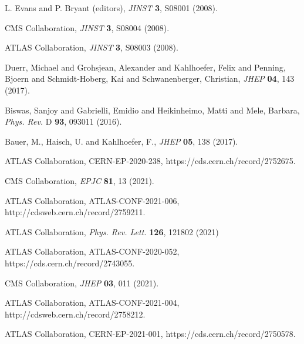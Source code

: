 \documentclass{moriond}
\def\Journal#1#2#3#4{{#1} {\bf #2}, #3 (#4)}
\def\PRL{\em Phys. Rev. Lett.}
\def\PRD{{\em Phys. Rev.} D}
\def\JINST{\em JINST}
\def\JHEP{\em JHEP}
\def\EPJC{\em EPJC}
\begin{document}
\begin{thebibliography}{99}

L. Evans and P. Bryant (editors), \Journal{\JINST}{3}{S08001}{2008}.

CMS Collaboration, \Journal{\JINST}{3}{S08004}{2008}.

ATLAS Collaboration, \Journal{\JINST}{3}{S08003}{2008}.

Duerr, Michael and Grohsjean, Alexander and Kahlhoefer, Felix and Penning, Bjoern and Schmidt-Hoberg, Kai and Schwanenberger, Christian, \Journal{\JHEP}{04}{143}{2017}.

Biswas, Sanjoy and Gabrielli, Emidio and Heikinheimo, Matti and Mele, Barbara, \Journal{\PRD}{93}{093011}{2016}.

Bauer, M., Haisch, U. and Kahlhoefer, F., \Journal{\JHEP}{05}{138}{2017}.

ATLAS Collaboration, CERN-EP-2020-238, https://cds.cern.ch/record/2752675.

CMS Collaboration, \Journal{\EPJC}{81}{13}{2021}.

ATLAS Collaboration, ATLAS-CONF-2021-006, http://cdsweb.cern.ch/record/2759211. 

ATLAS Collaboration, \Journal{\PRL}{126}{121802}{2021} 

ATLAS Collaboration, ATLAS-CONF-2020-052, https://cds.cern.ch/record/2743055.

CMS Collaboration, \Journal{\JHEP}{03}{011}{2021}.

ATLAS Collaboration, ATLAS-CONF-2021-004, http://cdsweb.cern.ch/record/2758212.

ATLAS Collaboration, CERN-EP-2021-001, https://cds.cern.ch/record/2750578.

\end{thebibliography}
\end{document}
